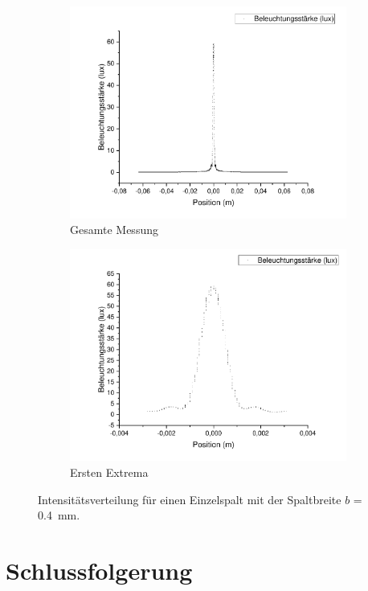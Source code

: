 \documentclass[
	a4paper,
	12pt,
	pagesize,
	ngerman
]{scrartcl}
\begin{document}
	\begin{figure}[H]
		\centering
		\begin{subfigure}{.5\textwidth}
			\centering
			\includegraphics[width=1\linewidth]{Einzelspalt0-400mm}
			\caption{Gesamte Messung}	
		\end{subfigure}%
		\begin{subfigure}{.5\textwidth}
			\centering
			\includegraphics[width=1\linewidth]{Einzelspalt0-400mmZOOM}
			\caption{Ersten Extrema}
		\end{subfigure}
		\label{Einzelspalt0-400mm}
		\caption{Intensitätsverteilung für einen Einzelspalt mit der Spaltbreite $b$ = \SI{0,4}{mm}.}
	\end{figure}

	\section{Schlussfolgerung}
	
	\printbibliography
\end{document}
